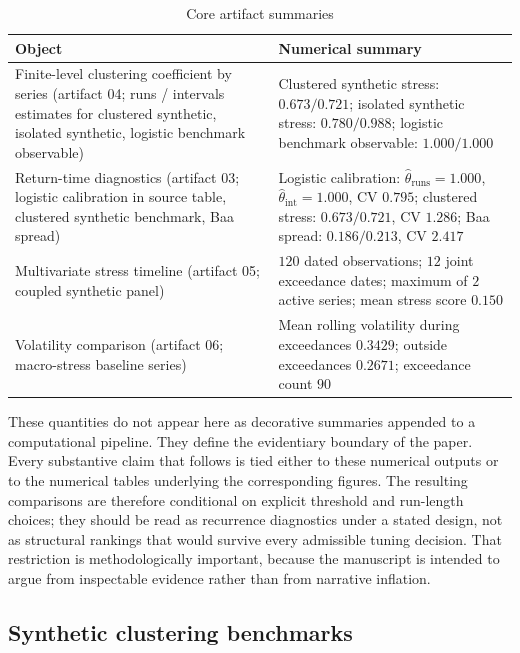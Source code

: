 \documentclass[11pt]{article}
\begin{document}
\begin{table}[H]
\centering
\caption{Core artifact summaries}
\label{tab:summary}
\begin{tabular}{>{\raggedright\arraybackslash}p{} >{\raggedright\arraybackslash}p{}}
\toprule
Object & Numerical summary \\
\midrule
Finite-level clustering coefficient by series (artifact 04; runs / intervals estimates for clustered synthetic, isolated synthetic, logistic benchmark observable) & Clustered synthetic stress: $0.673 / 0.721$; isolated synthetic stress: $0.780 / 0.988$; logistic benchmark observable: $1.000 / 1.000$ \\
Return-time diagnostics (artifact 03; logistic calibration in source table, clustered synthetic benchmark, Baa spread) & Logistic calibration: $\widehat{\theta}_{\mathrm{runs}}=1.000$, $\widehat{\theta}_{\mathrm{int}}=1.000$, CV $0.795$; clustered stress: $0.673 / 0.721$, CV $1.286$; Baa spread: $0.186 / 0.213$, CV $2.417$ \\
Multivariate stress timeline (artifact 05; coupled synthetic panel) & $120$ dated observations; $12$ joint exceedance dates; maximum of $2$ active series; mean stress score $0.150$ \\
Volatility comparison (artifact 06; macro-stress baseline series) & Mean rolling volatility during exceedances $0.3429$; outside exceedances $0.2671$; exceedance count $90$ \\
\bottomrule
\end{tabular}
\end{table}

These quantities do not appear here as decorative summaries appended to a computational pipeline. They define the evidentiary boundary of the paper. Every substantive claim that follows is tied either to these numerical outputs or to the numerical tables underlying the corresponding figures. The resulting comparisons are therefore conditional on explicit threshold and run-length choices; they should be read as recurrence diagnostics under a stated design, not as structural rankings that would survive every admissible tuning decision. That restriction is methodologically important, because the manuscript is intended to argue from inspectable evidence rather than from narrative inflation.

\subsection{Synthetic clustering benchmarks}
\end{document}
